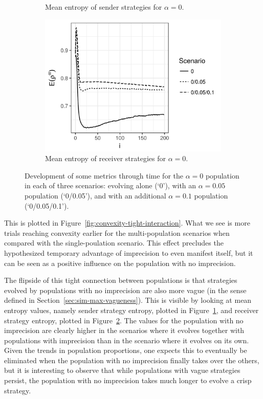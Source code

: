 \documentclass[a4paper]{article}
\begin{document}
\begin{figure}
\begin{subfigure}[]{0.32\textwidth}
    \caption{Mean entropy of sender strategies for $\alpha = 0$.}
    \label{fig:entropy-sender-tight-interaction}
  \end{subfigure}
  \hfill
  \begin{subfigure}[]{0.32\textwidth}
    \includegraphics[width=\textwidth]{simulation/results/round-3/plots/entropy-receiver-all-strong.png}
    \caption{Mean entropy of receiver strategies for $\alpha = 0$.}
    \label{fig:entropy-receiver-tight-interaction}
  \end{subfigure}
  \caption{Development of some metrics through time for the $\alpha = 0$ population in each of three scenarios: evolving alone (`0'), with an $\alpha = 0.05$ population (`0/0.05'), and with an additional $\alpha = 0.1$ population (`0/0.05/0.1').}
  \label{fig:metrics-tight-interaction}
\end{figure}
This is plotted in Figure~\ref{fig:convexity-tight-interaction}.
What we see is more trials reaching convexity earlier for the multi-population scenarios when compared with the single-poulation scenario.
This effect precludes the hypothesized temporary advantage of imprecision to even manifest itself, but it can be seen as a positive influence on the population with no imprecision.

The flipside of this tight connection between populations is that strategies evolved by populations with no imprecision are also more vague (in the sense defined in Section~\ref{sec:sim-max-vagueness}).
This is visible by looking at mean entropy values, namely sender strategy entropy, plotted in Figure~\ref{fig:entropy-sender-tight-interaction}, and receiver strategy entropy, plotted in Figure~\ref{fig:entropy-receiver-tight-interaction}.
The values for the population with no imprecision are clearly higher in the scenarios where it evolves together with populations with imprecision than in the scenario where it evolves on its own.
Given the trends in population proportions, one expects this to eventually be eliminated when the population with no imprecision finally takes over the others, but it is interesting to observe that while populations with vague strategies persist, the population with no imprecision takes much longer to evolve a crisp strategy.
\end{document}
